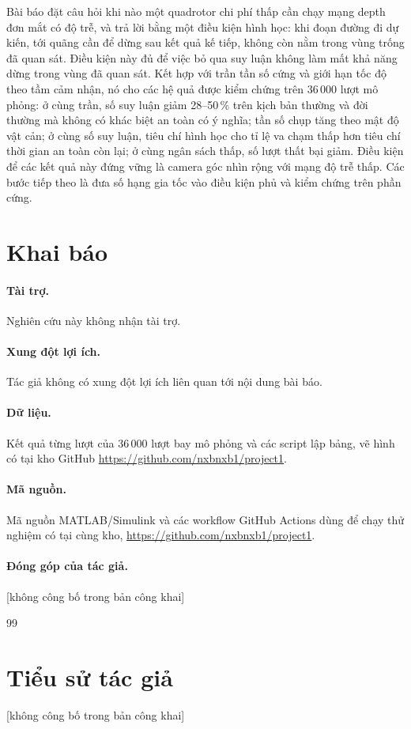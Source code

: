 \documentclass[11pt,a4paper]{article}
\theoremstyle{plain}
\theoremstyle{definition}
\theoremstyle{remark}
\begin{document}
Bài báo đặt câu hỏi khi nào một quadrotor chi phí thấp cần chạy mạng depth đơn mắt có độ trễ, và trả lời bằng một điều kiện hình học: khi đoạn đường đi dự kiến, tới quãng cần để dừng sau kết quả kế tiếp, không còn nằm trong vùng trống đã quan sát. Điều kiện này đủ để việc bỏ qua suy luận không làm mất khả năng dừng trong vùng đã quan sát. Kết hợp với trần tần số cứng và giới hạn tốc độ theo tầm cảm nhận, nó cho các hệ quả được kiểm chứng trên 36\,000 lượt mô phỏng: ở cùng trần, số suy luận giảm 28--50\,\% trên kịch bản thường và đời thường mà không có khác biệt an toàn có ý nghĩa; tần số chụp tăng theo mật độ vật cản; ở cùng số suy luận, tiêu chí hình học cho tỉ lệ va chạm thấp hơn tiêu chí thời gian an toàn còn lại; ở cùng ngân sách thấp, số lượt thất bại giảm. Điều kiện để các kết quả này đứng vững là camera góc nhìn rộng với mạng độ trễ thấp. Các bước tiếp theo là đưa số hạng gia tốc vào điều kiện phủ và kiểm chứng trên phần cứng.

\section*{Khai báo}

\paragraph{Tài trợ.} Nghiên cứu này không nhận tài trợ.
\paragraph{Xung đột lợi ích.} Tác giả không có xung đột lợi ích liên quan tới nội dung bài báo.
\paragraph{Dữ liệu.} Kết quả từng lượt của 36\,000 lượt bay mô phỏng và các script lập bảng, vẽ hình có tại kho GitHub \url{https://github.com/nxbnxb1/project1}.
\paragraph{Mã nguồn.} Mã nguồn MATLAB/Simulink và các workflow GitHub Actions dùng để chạy thử nghiệm có tại cùng kho, \url{https://github.com/nxbnxb1/project1}.
\paragraph{Đóng góp của tác giả.} [không công bố trong bản công khai]

\begin{thebibliography}{99}
\small

\end{thebibliography}

\section*{Tiểu sử tác giả}
[không công bố trong bản công khai]
\end{document}
